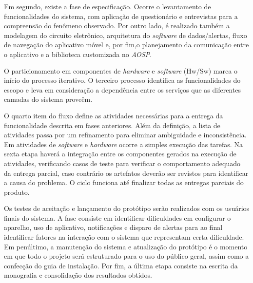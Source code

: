 Em segundo, existe a fase de especificação. Ocorre o levantamento de funcionalidades do sistema, com aplicação de questionário e entrevistas para a compreensão do fenômeno observado. Por outro lado, é realizado também a modelagem do circuito eletrônico, arquitetura do \textit{software} de dados/alertas, fluxo de navegação do aplicativo móvel e, por fim,o planejamento da comunicação entre o aplicativo e a biblioteca customizada no \textit{AOSP}. 

O particionamento em componentes de \textit{hardware} e \textit{software} (Hw/Sw) marca o início do processo iterativo. O terceiro processo identifica as funcionalidades do escopo e leva em consideração a dependência entre os serviços que as diferentes camadas do sistema proveêm.

O quarto item do fluxo define as atividades necessárias para a entrega da funcionalidade descrita em fases anteriores. Além da definição, a lista de atividades passa por um refinamento para eliminar ambiguidade e inconsistência. Em atividades de \textit{software} e \textit{hardware} ocorre a simples execução das  tarefas. Na sexta etapa haverá a integração entre os componentes gerados na execução de atividades, verificando casos de teste para verificar o comportamento adequado da entrega parcial, caso contrário os artefatos deverão ser revistos para identificar a causa do problema. O ciclo funciona até finalizar todas as entregas parciais do produto.

Os testes de aceitação e lançamento do protótipo serão realizados com os usuários finais do sistema. A fase consiste em identificar dificuldades em configurar o aparelho, uso de aplicativo, notificações e disparo de alertas para ao final identificar fatores na interação com o sistema que representam certa dificuldade. Em penúltimo, a manutenção do sistema e atualização do protótipo é o momento em que todo o projeto será estruturado para o uso do público geral, assim como a confecção do guia de instalação. Por fim, a última etapa consiste na escrita da monografia e consolidação dos resultados obtidos.